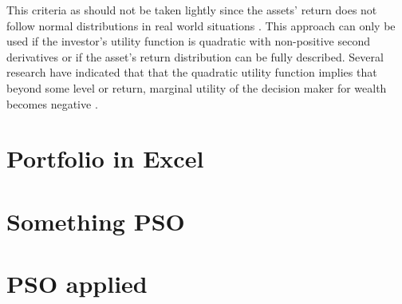 \documentclass{pdfmx4020}
\begin{document}
    This criteria as should not be taken lightly since the assets' return does not follow normal distributions in real world situations \cite{non-dist}. This approach can only be used if the investor's utility function is quadratic with non-positive second derivatives or if the asset's return distribution can be fully described. Several research have indicated that that the quadratic utility function implies that beyond some level or return, marginal utility of the decision maker for wealth becomes negative \cite{crit2,crit3}. 

  





  \section{Portfolio in Excel} %
  \label{sec:portfolio_in_excel}
    

  \section{Something PSO} %
  \label{sec:something_pso}
  

  \section{PSO applied} %
  \label{sec:pso_applied}
  
\end{document}
